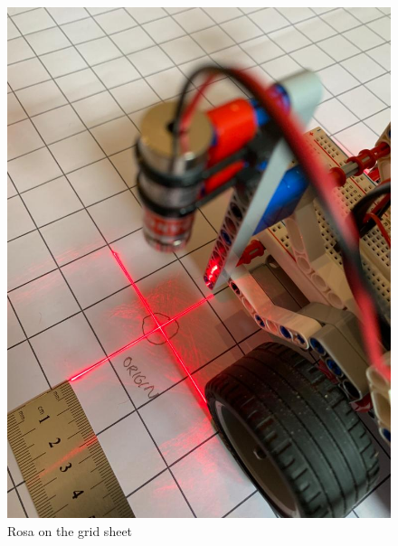 {\begin{itemize}
        \begin{figure}[!ht] %
            \centering
            \includegraphics[scale=0.2]{images/Measurement Facility.jpeg}
            \caption{Rosa on the grid sheet}
            \label{fig:Method of measuring grid}
        \end{figure}
        

\end{itemize}}
